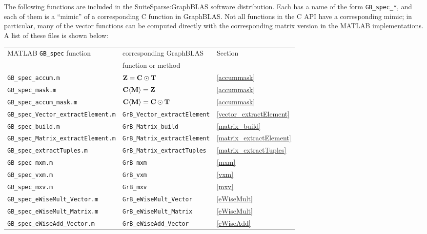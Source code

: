 \documentclass[12pt]{article}
\begin{document}
The following functions are included in the SuiteSparse:GraphBLAS software
distribution.  Each has a name of the form \verb'GB_spec_*', and each of them
is a ``mimic'' of a corresponding C function in GraphBLAS.  Not all functions
in the C API have a corresponding mimic; in particular, many of the vector
functions can be computed directly with the corresponding matrix version in the
MATLAB implementations.  A list of these files is shown below:

\vspace{0.2in}
{\footnotesize
\begin{tabular}{lll}
MATLAB \verb'GB_spec' function          & corresponding GraphBLAS           & Section \\
                                        & function or  method               & \\
\hline
\verb'GB_spec_accum.m'                  & ${\bf Z = C \odot T}$                     & \ref{accummask} \\
\verb'GB_spec_mask.m'                   & ${\bf C \langle M \rangle = Z}$           & \ref{accummask} \\
\verb'GB_spec_accum_mask.m'             & ${\bf C \langle M \rangle = C \odot T}$   & \ref{accummask} \\
\hline
\verb'GB_spec_Vector_extractElement.m'  & \verb'GrB_Vector_extractElement'  & \ref{vector_extractElement} \\
\hline
\verb'GB_spec_build.m'                  & \verb'GrB_Matrix_build'           & \ref{matrix_build} \\
\verb'GB_spec_Matrix_extractElement.m'  & \verb'GrB_Matrix_extractElement'  & \ref{matrix_extractElement} \\
\verb'GB_spec_extractTuples.m'          & \verb'GrB_Matrix_extractTuples'   & \ref{matrix_extractTuples} \\
\hline
\verb'GB_spec_mxm.m'                    & \verb'GrB_mxm'                    & \ref{mxm} \\
\verb'GB_spec_vxm.m'                    & \verb'GrB_vxm'                    & \ref{vxm} \\
\verb'GB_spec_mxv.m'                    & \verb'GrB_mxv'                    & \ref{mxv} \\
\hline
\verb'GB_spec_eWiseMult_Vector.m'       & \verb'GrB_eWiseMult_Vector'       & \ref{eWiseMult} \\
\verb'GB_spec_eWiseMult_Matrix.m'       & \verb'GrB_eWiseMult_Matrix'       & \ref{eWiseMult} \\
\verb'GB_spec_eWiseAdd_Vector.m'        & \verb'GrB_eWiseAdd_Vector'        & \ref{eWiseAdd} \\

\end{tabular}}
\end{document}
